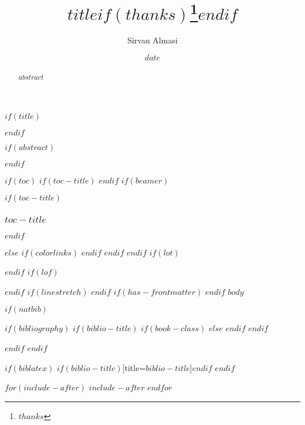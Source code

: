 \documentclass{tufte-handout}
\title{$title$$if(thanks)$\thanks{$thanks$}$endif$}
\author[Sirvan Almasi]{Sirvan Almasi}
\date{$date$}
\begin{document}
$if(title)$
\maketitle
$endif$

$if(abstract)$
\begin{abstract}
$abstract$
\end{abstract}
$endif$

$if(toc)$
$if(toc-title)$
\renewcommand*\contentsname{$toc-title$}
$endif$
$if(beamer)$
\begin{frame}[allowframebreaks]
$if(toc-title)$
  \frametitle{$toc-title$}
$endif$
  \tableofcontents[hideallsubsections]
\end{frame}
$else$
{
$if(colorlinks)$
\hypersetup{linkcolor=$if(toccolor)$$toccolor$$else$$endif$}
$endif$
\setcounter{tocdepth}{$toc-depth$}
\tableofcontents
}
$endif$
$endif$
$if(lot)$
\listoftables
$endif$
$if(lof)$
\listoffigures
$endif$
$if(linestretch)$
$endif$
$if(has-frontmatter)$
\mainmatter
$endif$
$body$


$if(natbib)$

$if(bibliography)$
    $if(biblio-title)$
      $if(book-class)$
         \renewcommand\bibname{$biblio-title$}
      $else$
         \renewcommand\refname{$biblio-title$}
      $endif$
    $endif$




  $endif$
$endif$

$if(biblatex)$
\printbibliography$if(biblio-title)$[title=$biblio-title$]$endif$
$endif$


$for(include-after)$
$include-after$
$endfor$
\end{document}
